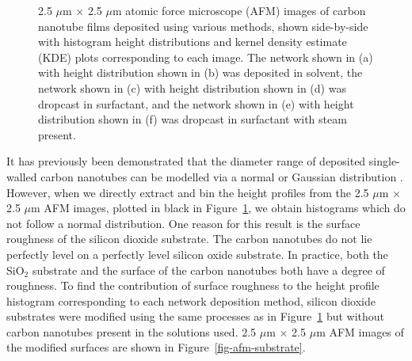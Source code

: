 \documentclass[
  a4paper,
]{scrbook}
\begin{document}
\begin{figure}
\begin{minipage}[t]{0.47\linewidth}
{{}

}

\subcaption{\label{fig-steaming-network-histogram}}
\end{minipage}%

\caption{\label{fig-afm-morphology}2.5 \(\mu\)m \(\times\) 2.5 \(\mu\)m
atomic force microscope (AFM) images of carbon nanotube films deposited
using various methods, shown side-by-side with histogram height
distributions and kernel density estimate (KDE) plots corresponding to
each image. The network shown in (a) with height distribution shown in
(b) was deposited in solvent, the network shown in (c) with height
distribution shown in (d) was dropcast in surfactant, and the network
shown in (e) with height distribution shown in (f) was dropcast in
surfactant with steam present.}

\end{figure}

It has previously been demonstrated that the diameter range of deposited
single-walled carbon nanotubes can be modelled via a normal or Gaussian
distribution \autocite{LeMieux2008,Liu2013,Vobornik2023}. However, when
we directly extract and bin the height profiles from the 2.5 \(\mu\)m
\(\times\) 2.5 \(\mu\)m AFM images, plotted in black in
Figure~\ref{fig-afm-morphology}, we obtain histograms which do not
follow a normal distribution. One reason for this result is the surface
roughness of the silicon dioxide substrate. The carbon nanotubes do not
lie perfectly level on a perfectly level silicon oxide substrate. In
practice, both the SiO\(_2\) substrate and the surface of the carbon
nanotubes both have a degree of roughness. To find the contribution of
surface roughness to the height profile histogram corresponding to each
network deposition method, silicon dioxide substrates were modified
using the same processes as in Figure~\ref{fig-afm-morphology} but
without carbon nanotubes present in the solutions used. 2.5 \(\mu\)m
\(\times\) 2.5 \(\mu\)m AFM images of the modified surfaces are shown in
Figure~\ref{fig-afm-substrate}.
\end{document}
